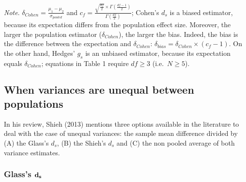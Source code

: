\documentclass[
  english,
  man,floatsintext]{apa6}
\begin{document}
\begin{landscape}
\emph{Note}. \(\delta_{Cohen}= \frac{\mu_1-\mu_2}{\sigma_{pooled}}\) and \(c_f=\frac{\sqrt{\frac{df}{2}} \times \Gamma\left( \frac{df-1}{2}\right)}{\Gamma\left( \frac{df}{2}\right)}\); Cohen's \(d_s\) is a biased estimator, because its expectation differs from the population effect size. Moreover, the larger the population estimator (\(\delta_{Cohen}\)), the larger the bias. Indeed, the bias is the difference between the expectation and \(\delta_{Cohen}\): \(\delta_{bias} = \delta_{Cohen} \times (c_f-1)\). On the other hand, Hedges' \(g_s\) is an unbiased estimator, because its expectation equals \(\delta_{Cohen}\); equations in Table 1 require \(df \ge 3\) (i.e.~\(N \ge 5\)).

\end{landscape}

\hypertarget{when-variances-are-unequal-between-populations}{%
\subsection{When variances are unequal between populations}\label{when-variances-are-unequal-between-populations}}

In his review, Shieh (2013) mentions three options available in the literature to deal with the case of unequal variances: the sample mean difference divided by (A) the Glass's \(d_s\), (B) the Shieh's \(d_s\) and (C) the non pooled average of both variance estimates.

\hypertarget{glasss-bf-d_s}{%
\subsubsection{\texorpdfstring{Glass's \(\bf d_s\)}{Glass's \textbackslash bf d\_s}}\label{glasss-bf-d_s}}
\end{document}
